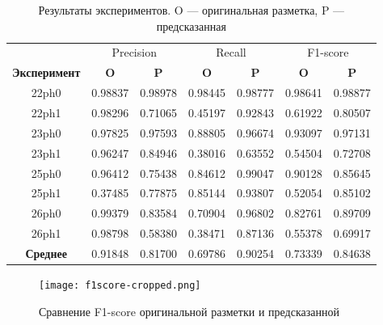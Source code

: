 \begin{table}[ht]
	\centering
	\label{tab:results}
	\begin{tabular}{ccccccc} \toprule
		                     & \multicolumn{2}{c}{Precision} & \multicolumn{2}{c}{Recall} & \multicolumn{2}{c}{F1-score}                                        \\
		\textbf{Эксперимент} & \textbf{O}                    & \textbf{P}                 & \textbf{O}                   & \textbf{P} & \textbf{O} & \textbf{P} \\ \midrule
		22ph0                & 0.98837                       & 0.98978                    & 0.98445                      & 0.98777    & 0.98641    & 0.98877    \\
		22ph1                & 0.98296                       & 0.71065                    & 0.45197                      & 0.92843    & 0.61922    & 0.80507    \\
		23ph0                & 0.97825                       & 0.97593                    & 0.88805                      & 0.96674    & 0.93097    & 0.97131    \\
		23ph1                & 0.96247                       & 0.84946                    & 0.38016                      & 0.63552    & 0.54504    & 0.72708    \\
		25ph0                & 0.96412                       & 0.75438                    & 0.84612                      & 0.99047    & 0.90128    & 0.85645    \\
		25ph1                & 0.37485                       & 0.77875                    & 0.85144                      & 0.93807    & 0.52054    & 0.85102    \\
		26ph0                & 0.99379                       & 0.83584                    & 0.70904                      & 0.96802    & 0.82761    & 0.89709    \\
		26ph1                & 0.98798                       & 0.58380                    & 0.38471                      & 0.87136    & 0.55378    & 0.69917    \\ \midrule
		\textbf{Среднее}     & 0.91848                       & 0.81700                    & 0.69786                      & 0.90254    & 0.73339    & 0.84638    \\ \bottomrule
	\end{tabular}
	\caption{\centering Результаты экспериментов. O --- оригинальная разметка, P --- предсказанная}
\end{table}

\begin{figure}[!htb]
	\centering
	\texttt{[image: f1score-cropped.png]}
	\caption{Сравнение F1-score оригинальной разметки и предсказанной}
	\label{fig:f1score-vs}
\end{figure}
